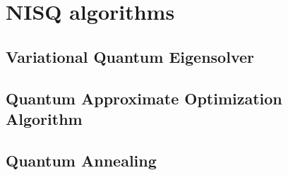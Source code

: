 \chapter{NISQ algorithms}


\section{Variational Quantum Eigensolver}


\section{Quantum Approximate Optimization Algorithm}


\section{Quantum Annealing}
